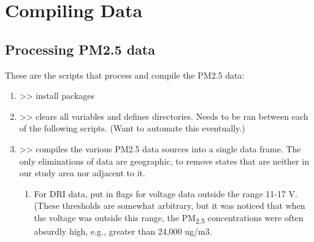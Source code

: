 \section{Compiling Data}

\subsection{Processing PM2.5 data}

These are the scripts that process and compile the PM2.5 data:
\begin{enumerate}[nolistsep]
\item {} >> install packages
\item {} >> clears all variables and defines directories. Needs to be ran between each of the following scripts. (Want to automate this eventually.)
\item {} >> compiles the various PM2.5 data sources into a single data frame. The only eliminations of data are geographic, to remove states that are neither in our study area nor adjacent to it.
	\begin{enumerate}
	\item For DRI data, put in flags for voltage data outside the range 11-17 V. (These thresholds are somewhat arbitrary, but it was noticed that when the voltage was outside this range, the PM\textsubscript{2.5} concentrations were often absurdly high, e.g., greater than 24,000 ug/m3.
	\end{enumerate}


\end{enumerate}
